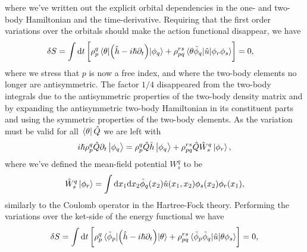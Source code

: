             where we've written out the explicit orbital dependencies in the
            one- and two-body Hamiltonian and the time-derivative.
            Requiring that the first order variations over the orbitals should
            make the action functional disappear, we have
            \begin{align}
                \delta S
                &=
                \int\dd t \left[ 
                    \rho^{q}_{p}
                    \mel*{\theta}{
                        \left( 
                            \hat{h}
                            - i\hslash\partial_t
                         \right)
                    }{\phi_q}
                    +
                    \rho^{rs}_{pq}
                    \mel*{\theta\tilde{\phi}_q}{
                        \hat{u}
                    }{\phi_r\phi_s}
                 \right]
                = 0,
            \end{align}
            where we stress that $p$ is now a free index, and where the two-body
            elements no longer are antisymmetric.
            The factor $1/4$ disappeared from the two-body integrals due to the
            antisymmetric properties of the two-body density matrix and by
            expanding the antisymmetric two-body Hamiltonian in its constituent
            parts and using the symmetric properties of the two-body elements.
            As the variation must be valid for all $\bra*{\theta}\hat{Q}$ we are
            left with
            \begin{align}
                i\hslash\rho^{q}_{p}\hat{Q}\partial_t\ket{\phi_q}
                = \rho^{q}_{p}\hat{Q}\hat{h}\ket{\phi_q}
                + \rho^{rs}_{pq}\hat{Q}\hat{W}^{q}_{s}\ket{\phi_{r}},
                \label{eq:ket-q}
            \end{align}
            where we've defined the mean-field potential $W^{q}_{s}$ to be
            \cite{kvaal2012ab}
            \begin{align}
                \hat{W}^{q}_{s}\ket{\phi_r}
                = \int\dd x_1 \dd x_2
                \tilde{\phi}_{q}(x_2)
                \hat{u}(x_1, x_2)
                \phi_s(x_2)
                \phi_r(x_1),
            \end{align}
            similarly to the Coulomb operator in the Hartree-Fock theory.
            Performing the variations over the ket-side of the energy functional
            we have
            \begin{align}
                \delta S
                = \int \dd t
                \left[ 
                    \rho^{q}_{p}
                    \mel*{\tilde{\phi}_p}{
                        \left( 
                            \hat{h}
                            - i\hslash \partial_t
                         \right)
                    }{\theta}
                    + \rho^{rs}_{pq}
                    \mel*{\tilde{\phi}_p\tilde{\phi}_q}{
                        \hat{u}
                    }{\theta\phi_s}
                 \right]
                = 0,
            \end{align}
